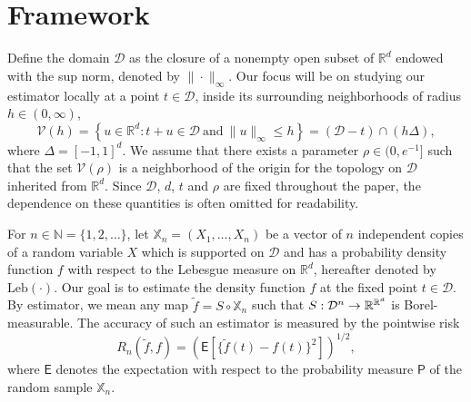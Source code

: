 \documentclass[bj,authoryear]{imsart}
\numberwithin{equation}{section}
\theoremstyle{plain}
\theoremstyle{remark}
\newcommand{\N}{\mathbb{N}}
\newcommand{\R}{\mathbb{R}}
\newcommand{\PP}{\mathsf{P}}
\newcommand{\EE}{\mathsf{E}}
\newcommand{\1}{\mathds{1}}
\newcommand{\domain}{\mathcal{D}}
\newcommand{\voisin}{\mathcal{V}}
\newcommand{\pwrisk}{R_n}
\begin{document}
\section{Framework}\label{sec:framework}

    Define the domain $\domain$ as the closure of a nonempty open subset of $\R^d$ endowed with the sup norm, denoted by $\|\cdot\|_{\infty}$. Our focus will be on studying our estimator locally at a point $t\in \domain$, inside its surrounding neighborhoods of radius $h\in (0,\infty)$,
    \begin{equation*}
        \voisin(h) = \left\{u\in \R^d : t+u\in \domain ~\text{and}~ \|u\|_{\infty} \leq h\right\} = (\domain - t) \cap (h \Delta),
    \end{equation*}
    where $\Delta = [-1,1]^d$.
    We assume that there exists a parameter $\rho\in (0,e^{-1}]$ such that the set $\voisin(\rho)$ is a neighborhood of the origin for the topology on $\domain$ inherited from $\R^d$.
    Since $\domain$, $d$, $t$ and $\rho$ are fixed throughout the paper, the dependence on these quantities is often omitted for readability.

    For $n\in \N=\{1,2,\ldots\}$, let $\mathbb{X}_n = (X_1,\ldots,X_n)$ be a vector of $n$ independent copies of a random variable $X$ which is supported on $\domain$ and has a probability density function $f$ with respect to the Lebesgue measure on $\R^d$, hereafter denoted by $\mathrm{Leb}(\cdot)$. Our goal is to estimate the density function $f$ at the fixed point $t\in \domain$. By estimator, we mean any map $\tilde{f} = S \circ \mathbb{X}_n$ such that $S:\domain^n \to \smash{\R^{\R^d}}$ is Borel-measurable.
    The accuracy of such an estimator is measured by the pointwise risk
    \begin{equation*}
        \pwrisk(\tilde{f}, f) = \left(\EE\left[\big\{\tilde{f}(t) - f(t)\big\}^2\right]\right)^{1/2},
    \end{equation*}
    where $\EE$ denotes the expectation with respect to the probability measure $\PP$ of the random sample $\mathbb{X}_n$.
\end{document}
